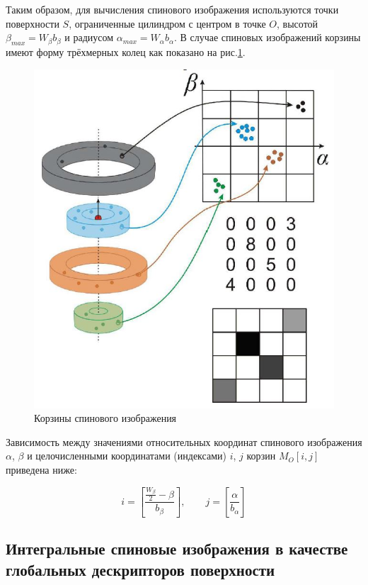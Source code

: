 \documentclass[14pt]{article}
\numberwithin{figure}{section}
\numberwithin{equation}{section}
\begin{document}
Таким образом, для вычисления спинового изображения используются точки поверхности $S$, ограниченные цилиндром с центром в точке $O$, высотой $\beta_{max} = W_{\beta}b_{\beta}$ и радиусом $\alpha_{max} = W_{\alpha} b_{\alpha}$. В случае спиновых изображений корзины имеют форму трёхмерных колец как показано на рис.\ref{ris:3}.

\begin{figure}[h]
	\begin{center}
		\includegraphics[scale=0.7]{3.JPG}
		\caption{Корзины спинового изображения}
		\label{ris:3}
	\end{center}
\end{figure}


Зависимость между значениями относительных координат спинового изображения $\alpha$, $\beta$ и целочисленными координатами (индексами) $i$, $j$ корзин $M_O[i, j]$ приведена ниже:

\begin{equation}
	i = \left[ \frac{\frac{W_{\beta}}{2} - \beta}{b_{\beta}} \right], \qquad j = \left[ \frac{\alpha}{b_{\alpha}} \right]
\end{equation}

\subsection{Интегральные спиновые изображения в качестве \\ глобальных дескрипторов поверхности}
\end{document}

